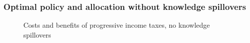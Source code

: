 \subsubsection{Optimal policy and allocation without knowledge spillovers}
\begin{figure}[h!!!]
	\centering
	\caption{Costs and benefits of progressive income taxes, no knowledge spillovers %
	}\label{fig:optAll_percLf_dyn_noknow}
	\begin{minipage}[]{0.32\textwidth}

\end{minipage}
\end{figure}
